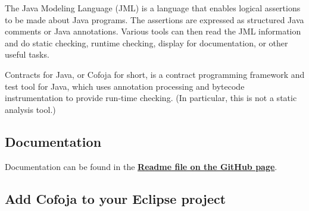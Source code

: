 \documentclass{article}
\begin{document}
The Java Modeling Language (JML) is a language that enables logical
assertions to be made about Java programs. The assertions are
expressed as structured Java comments or Java annotations. Various
tools can then read the JML information and do static checking,
runtime checking, display for documentation, or other useful tasks.

Contracts for Java, or Cofoja for short, is a contract programming
framework and test tool for Java, which uses annotation processing and
bytecode instrumentation to provide run-time checking. (In particular,
this is not a static analysis tool.) 

\subsection{Documentation}

Documentation can be found in the
\href{https://github.com/nhatminhle/cofoja}{\textbf{Readme file on the
    GitHub page}}.

\subsection{Add Cofoja to your Eclipse project}
\label{subsec-add}
\end{document}
